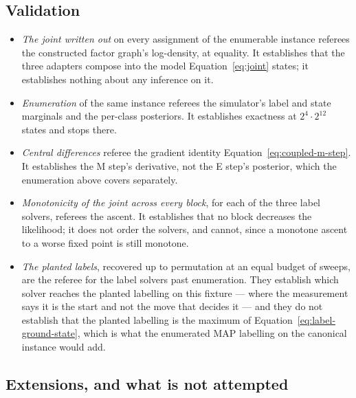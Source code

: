 \documentclass[11pt,a4paper]{article}
\begin{document}
\subsection{Validation}
\label{sec:coupled:validation}
\begin{itemize}
  \item \emph{The joint written out} on every assignment of the enumerable
    instance referees the constructed factor graph's log-density, at equality.
    It establishes that the three adapters compose into the model
    Equation~\ref{eq:joint} states; it establishes nothing about any inference
    on it.
  \item \emph{Enumeration} of the same instance referees the simulator's
    label and state marginals and the per-class posteriors. It establishes
    exactness at $2^4 \cdot 2^{12}$ states and stops there.
  \item \emph{Central differences} referee the gradient identity
    Equation~\ref{eq:coupled-m-step}. It establishes the M step's derivative,
    not the E step's posterior, which the enumeration above covers separately.
  \item \emph{Monotonicity of the joint across every block}, for each of the
    three label solvers, referees the ascent. It establishes that no block
    decreases the likelihood; it does not order the solvers, and cannot, since
    a monotone ascent to a worse fixed point is still monotone.
  \item \emph{The planted labels}, recovered up to permutation at an equal
    budget of sweeps, are the referee for the label solvers past enumeration.
    They establish which solver reaches the planted labelling on this fixture
    --- where the measurement says it is the start and not the move that
    decides it --- and they do not establish that the planted labelling is the
    maximum of Equation~\ref{eq:label-ground-state}, which is what the
    enumerated MAP labelling on the canonical instance would add.
\end{itemize}

\subsection{Extensions, and what is not attempted}
\label{sec:coupled:extensions}
\end{document}
